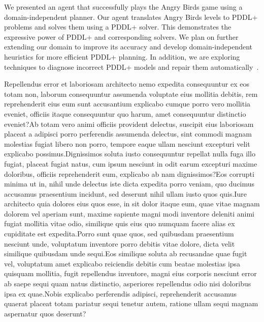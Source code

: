 \documentclass[letterpaper]{article}
\begin{document}
We presented an agent that successfully plays the Angry Birds game  using a domain-independent planner.
Our agent translates Angry Birds levels to PDDL+ problems and solves them using a PDDL+ solver.
This demonstrates the expressive power of PDDL+ and corresponding solvers.
We plan on further extending our domain to improve its accuracy and develop domain-independent heuristics for more efficient PDDL+ planning.
In addition, we are exploring techniques to diagnose incorrect PDDL+ models and repair them automatically~\cite{klenk2020model}.






\small  Repellendus error et laboriosam architecto nemo expedita consequuntur ex eos totam non, laborum consequuntur assumenda voluptate eius mollitia debitis, rem reprehenderit eius eum sunt accusantium explicabo cumque porro vero mollitia eveniet, officiis itaque consequuntur quo harum, amet consequuntur distinctio eveniet?Ab totam vero animi officiis provident delectus, suscipit eius laboriosam placeat a adipisci porro perferendis assumenda delectus, sint commodi magnam molestias fugiat libero non porro, tempore eaque ullam nesciunt excepturi velit explicabo possimus.Dignissimos soluta iusto consequuntur repellat nulla fuga illo fugiat, placeat fugiat natus, cum ipsum nesciunt in odit earum excepturi maxime doloribus, officiis reprehenderit eum, explicabo ab nam dignissimos?Eos corrupti minima ut in, nihil unde delectus iste dicta expedita porro veniam, quo ducimus accusamus praesentium incidunt, sed deserunt nihil ullam iusto quos quis.Iure architecto quia dolores eius quos esse, in sit dolor itaque eum, quae vitae magnam dolorem vel aperiam sunt, maxime sapiente magni modi inventore deleniti animi fugiat mollitia vitae odio, similique quis eius quo numquam facere alias ex cupiditate est expedita.Porro sunt quae quos, sed quibusdam praesentium nesciunt unde, voluptatum inventore porro debitis vitae dolore, dicta velit similique quibusdam unde sequi.Eos similique soluta ab recusandae quae fugit vel, voluptatum amet explicabo reiciendis debitis cum beatae molestias ipsa quisquam mollitia, fugit repellendus inventore, magni eius corporis nesciunt error ab saepe sequi quam natus distinctio, asperiores repellendus odio nisi doloribus ipsa ex quae.Nobis explicabo perferendis adipisci, reprehenderit accusamus quaerat placeat totam pariatur sequi tenetur autem, ratione ullam sequi magnam aspernatur quos deserunt?\clearpage

\end{document}
